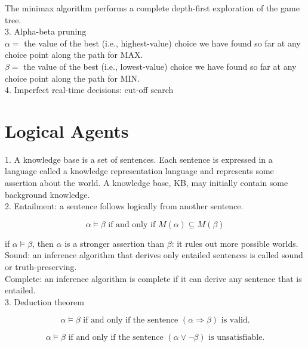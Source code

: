 \documentclass[12pt]{article}
\begin{document}
The minimax algorithm performs a complete depth-first exploration of the game tree. \\

3. Alpha-beta pruning \\

$\alpha =$ the value of the best (i.e., highest-value) choice we have found so far at any choice point along the path for MAX. \\
$\beta =$ the value of the best (i.e., lowest-value) choice we have found so far at any choice point along the path for MIN. \\

4. Imperfect real-time decisions: cut-off search

\section{Logical Agents}

1. A knowledge base is a set of sentences. Each sentence is expressed in a language called a knowledge representation language and represents some assertion about the world. A knowledge base, KB, may initially contain some background knowledge. \\

2. Entailment: a sentence follows logically from another sentence.

\begin{equation*}
  \alpha \models \beta \text{ if and only if } M(\alpha) \subseteq M(\beta)
\end{equation*}

if $\alpha \models \beta$, then $\alpha$ is a stronger assertion than $\beta$: it rules out more possible worlds. \\

Sound: an inference algorithm that derives only entailed sentences is called sound or truth-preserving. \\

Complete: an inference algorithm is complete if it can derive any sentence that is entailed. \\

3. Deduction theorem

\begin{equation*}
  \alpha \models \beta \text{ if and only if the sentence } (\alpha \Rightarrow \beta) \text{ is valid.}
\end{equation*}

\begin{equation*}
  \alpha \models \beta \text{ if and only if the sentence } (\alpha \lor \lnot \beta) \text{ is unsatisfiable.}
\end{equation*}
\end{document}
